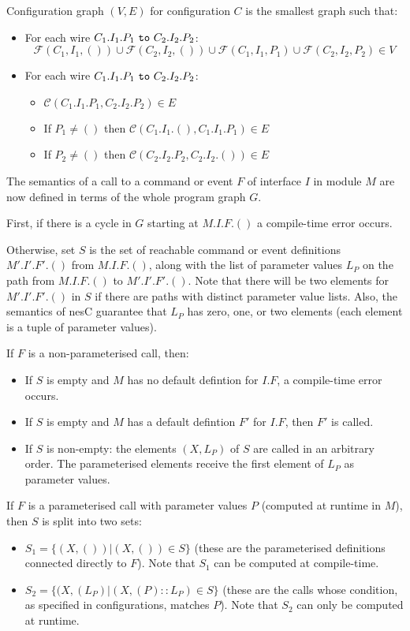 \documentclass[11pt]{article}
\newcommand{\kw}[1]{{\tt #1}}
\newcommand{\nesc}{nesC\xspace}
\newcommand{\FSE}{\mathcal{F}}
\newcommand{\connect}{\mathcal{C}}
\begin{document}
Configuration graph $(V,E)$ for configuration $C$ is the smallest graph
such that:
\begin{itemize}
\item For each wire $C_1.I_1.P_1 \kw{\ to\ } C_2.I_2.P_2$:
$$\FSE(C_1, I_1, ()) \cup \FSE(C_2, I_2, ()) \cup \FSE(C_1, I_1, P_1) \cup
\FSE(C_2, I_2, P_2) \in V$$

\item For each wire $C_1.I_1.P_1 \kw{\ to\ } C_2.I_2.P_2$:
\begin{itemize}
\item $\connect(C_1.I_1.P_1, C_2.I_2.P_2) \in E$
\item If $P_1 \not= ()$ then $\connect(C_1.I_1.(), C_1.I_1.P_1) \in E$
\item If $P_2 \not= ()$ then $\connect(C_2.I_2.P_2, C_2.I_2.()) \in E$
\end{itemize}
\end{itemize}

The semantics of a call to a command or event $F$ of interface $I$ in
module $M$ are now defined in terms of the whole program graph $G$.

First, if there is a cycle in $G$ starting at $M.I.F.()$ a compile-time
error occurs.

Otherwise, set $S$ is the set of reachable command or event definitions
$M'.I'.F'.()$ from $M.I.F.()$, along with the list of parameter values
$L_P$ on the path from $M.I.F.()$ to $M'.I'.F'.()$. Note that there will be
two elements for $M'.I'.F'.()$ in $S$ if there are paths with distinct
parameter value lists. Also, the semantics of \nesc guarantee that $L_P$
has zero, one, or two elements (each element is a tuple of parameter
values).

If $F$ is a non-parameterised call, then:
\begin{itemize}
\item If $S$ is empty and $M$ has no default defintion for $I.F$, a
compile-time error occurs.
\item If $S$ is empty and $M$ has a default defintion $F'$ for $I.F$, then
$F'$ is called.
\item If $S$ is non-empty: the elements $(X, L_P)$ of $S$ are
called in an arbitrary order. The parameterised elements receive
the first element of $L_P$ as parameter values.
\end{itemize}

If $F$ is a parameterised call with parameter values $P$ (computed at
runtime in $M$), then $S$ is split into two sets: 
\begin{itemize}
\item $S_1 = \{ (X, ()) | (X, ()) \in S \}$ (these are the parameterised
definitions connected directly to $F$). Note that $S_1$ can be computed
at compile-time.
\item $S_2 = \{ (X, (L_P) | (X, (P) :: L_P) \in S \}$ (these are the calls
whose condition, as specified in configurations, matches $P$). Note that
$S_2$ can only be computed at runtime.
\end{itemize}
\end{document}

